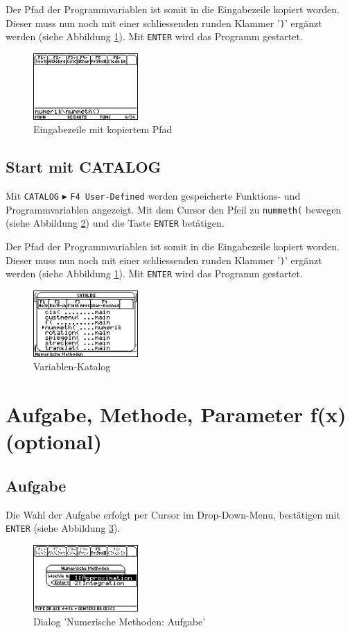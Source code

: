 \documentclass[
	a4paper							%
	,12pt							%
	,twoside						%
	,openright						%
]{scrreprt}							%
\begin{document}
Der Pfad der Programmvariablen ist somit in die Eingabezeile kopiert worden. Dieser muss nun noch mit einer schliessenden runden Klammer '\verb|)|' erg\"anzt werden (siehe Abbildung \ref{fig:CLI}). Mit \verb|ENTER| wird das Programm gestartet.
\begin{figure}[h]
  \centering
  \includegraphics[width=4cm]{img/nummeth_image003.png}
  \caption{Eingabezeile mit kopiertem Pfad}
  \label{fig:CLI}
\end{figure}

\subsection*{Start mit CATALOG}
Mit \verb|CATALOG| $\blacktriangleright$ \verb|F4 User-Defined| werden gespeicherte Funk­tions- und Programmvariablen an­ge­zeigt. Mit dem Cursor den Pfeil zu \verb|nummeth(| bewegen (siehe Abbildung \ref{fig:CATALOG}) und die Taste \verb|ENTER| bet\"atigen.

Der Pfad der Programmvariablen ist somit in die Eingabezeile kopiert worden. Dieser muss nun noch mit einer schliessenden runden Klammer '\verb|)|' erg\"anzt werden (siehe Abbildung \ref{fig:CLI}). Mit \verb|ENTER| wird das Programm gestartet.
\begin{figure}[h]
  \centering
  \includegraphics[width=4cm]{img/nummeth_image005.png}
  \caption{Variablen-Katalog}
  \label{fig:CATALOG}
\end{figure}

\section{Aufgabe, Methode, Parameter f(x) (optional)}
\subsection*{Aufgabe}
Die Wahl der Aufgabe erfolgt per Cursor im Drop-Down-Menu, best\"atigen mit \verb|ENTER| (siehe Abbildung \ref{fig:Aufgabe}).
\begin{figure}[h]
  \centering
  \includegraphics[width=4cm]{img/nummeth_image008.png}
  \caption{Dialog 'Numerische Methoden: Aufgabe’}
  \label{fig:Aufgabe}
\end{figure}
\end{document}
